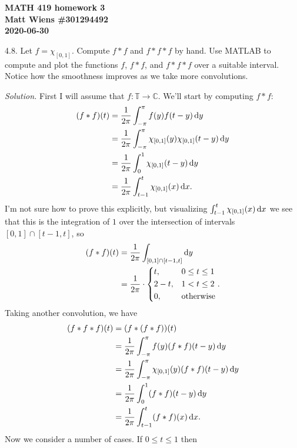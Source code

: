 \documentclass{article}
\newcommand{\T}{\mathbb{T}}
\newcommand{\C}{\mathbb{C}}
\begin{document}
\textbf{MATH 419 homework 3} \\
\textbf{Matt Wiens \#301294492} \\
\textbf{2020-06-30}

4.8. Let $f = \chi_{[0, 1]}$. Compute $f * f$ and $f * f * f$ by hand.
Use MATLAB to compute and plot the functions $f$, $f * f$, and
$f * f * f$ over a suitable interval. Notice how the smoothness improves
as we take more convolutions.

\textit{Solution.}
First I will assume that $f: \T \to \C$. We'll start by computing
$f * f$:
%
\begin{align*}
    (f * f)(t)
        &= \frac{1}{2 \pi} \int_{-\pi}^\pi f(y) f(t - y) \dif y \\
        &= \frac{1}{2 \pi} \int_{-\pi}^\pi \chi_{[0, 1]}(y) \chi_{[0, 1]}(t - y) \dif y \\
        &= \frac{1}{2 \pi} \int_0^1 \chi_{[0, 1]}(t - y) \dif y \\
        &= \frac{1}{2 \pi} \int_{t - 1}^t \chi_{[0, 1]}(x) \dif x
    .
\end{align*}
%
I'm not sure how to prove this explicitly, but visualizing
$\int_{t - 1}^t \chi_{[0, 1]}(x) \dif x$ we see that this is the
integration of $1$ over the intersection of intervals
$[0, 1] \cap [t - 1, t]$, so
%
\begin{align*}
    (f * f)(t)
        &= \frac{1}{2 \pi} \int_{[0, 1] \cap [t - 1, t]} \dif y \\
        &= \frac{1}{2 \pi} \cdot
        \begin{dcases}
            t, & 0 \leq t \leq 1 \\
            2 - t, & 1 < t \leq 2 \\
            0, & \text{otherwise}
        \end{dcases}
        .
\end{align*}
%
Taking another convolution, we have
%
\begin{align*}
    (f * f * f)(t)
        &= (f * (f * f))(t) \\
        &= \frac{1}{2 \pi} \int_{-\pi}^\pi f(y) (f * f)(t - y) \dif y \\
        &= \frac{1}{2 \pi} \int_{-\pi}^\pi \chi_{[0, 1]}(y) (f * f)(t - y) \dif y \\
        &= \frac{1}{2 \pi} \int_0^1 (f * f)(t - y) \dif y \\
        &= \frac{1}{2 \pi} \int_{t - 1}^t (f * f)(x) \dif x
        .
\end{align*}
%
Now we consider a number of cases. If $0 \leq t \leq 1$ then
\end{document}
